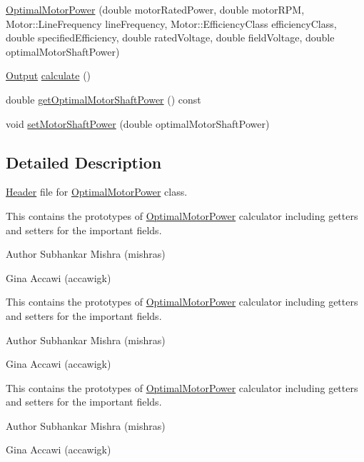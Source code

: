 \begin{DoxyCompactItemize}
\hyperlink{class_optimal_motor_power_a36017bbd359437ce77c1e18dc2377961}{Optimal\+Motor\+Power} (double motor\+Rated\+Power, double motor\+R\+PM, Motor\+::\+Line\+Frequency line\+Frequency, Motor\+::\+Efficiency\+Class efficiency\+Class, double specified\+Efficiency, double rated\+Voltage, double field\+Voltage, double optimal\+Motor\+Shaft\+Power)
\item 
\hyperlink{struct_optimal_motor_power_1_1_output}{Output} \hyperlink{class_optimal_motor_power_ab756397f68c530172d4fdd5ce8d2d27d}{calculate} ()
\item 
double \hyperlink{class_optimal_motor_power_a7d6e976abf406c54637d3b51e098d7c8}{get\+Optimal\+Motor\+Shaft\+Power} () const
\item 
void \hyperlink{class_optimal_motor_power_ada8a9e3caac34c54470ad13ffe7edf53}{set\+Motor\+Shaft\+Power} (double optimal\+Motor\+Shaft\+Power)
\end{DoxyCompactItemize}


\subsection{Detailed Description}
\hyperlink{class_header}{Header} file for \hyperlink{class_optimal_motor_power}{Optimal\+Motor\+Power} class. 

This contains the prototypes of \hyperlink{class_optimal_motor_power}{Optimal\+Motor\+Power} calculator including getters and setters for the important fields.

\begin{DoxyAuthor}{Author}
Subhankar Mishra (mishras) 

Gina Accawi (accawigk) 
\end{DoxyAuthor}


This contains the prototypes of \hyperlink{class_optimal_motor_power}{Optimal\+Motor\+Power} calculator including getters and setters for the important fields.

\begin{DoxyAuthor}{Author}
Subhankar Mishra (mishras) 

Gina Accawi (accawigk) 
\end{DoxyAuthor}


This contains the prototypes of \hyperlink{class_optimal_motor_power}{Optimal\+Motor\+Power} calculator including getters and setters for the important fields.

\begin{DoxyAuthor}{Author}
Subhankar Mishra (mishras) 

Gina Accawi (accawigk) 
\end{DoxyAuthor}


